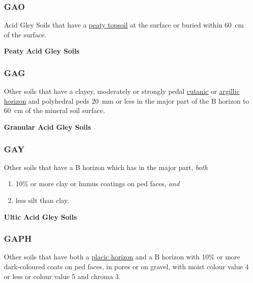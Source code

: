 \documentclass[
  letterpaper,
  DIV=11,
  numbers=noendperiod]{scrreprt}
\providecommand{\tightlist}{%
  \setlength{\itemsep}{0pt}\setlength{\parskip}{0pt}}\usepackage{longtable,booktabs,array}
\begin{document}
\hypertarget{sec-key-GAO}{%
\subsubsection{\texorpdfstring{\textbf{GAO}}{GAO}}\label{sec-key-GAO}}

Acid Gley Soils that have a \protect\hyperlink{sec-diag-pts}{peaty
topsoil} at the surface or buried within 60~cm of the surface.

\textbf{Peaty Acid Gley Soils}

\hypertarget{sec-key-GAG}{%
\subsubsection{\texorpdfstring{\textbf{GAG}}{GAG}}\label{sec-key-GAG}}

Other soils that have a clayey, moderately or strongly pedal
\protect\hyperlink{sec-diag-cuth}{cutanic} or
\protect\hyperlink{sec-diag-argh}{argillic horizon} and polyhedral peds
20~mm or less in the major part of the B horizon to 60~cm of the mineral
soil surface.

\textbf{Granular Acid Gley Soils}

\hypertarget{sec-key-GAY}{%
\subsubsection{\texorpdfstring{\textbf{GAY}}{GAY}}\label{sec-key-GAY}}

Other soils that have a B horizon which has in the major part,
\emph{both}

\begin{enumerate}
\def\labelenumi{\arabic{enumi}.}
\tightlist
\item
  10\% or more clay or humus coatings on ped faces, \emph{and}
\item
  less silt than clay.
\end{enumerate}

\textbf{Ultic Acid Gley Soils}

\hypertarget{sec-key-GAPH}{%
\subsubsection{\texorpdfstring{\textbf{GAPH}}{GAPH}}\label{sec-key-GAPH}}

Other soils that have both a \protect\hyperlink{sec-diag-plac}{placic
horizon} and a B horizon with 10\% or more dark-coloured coats on ped
faces, in pores or on gravel, with moist colour value 4 or less or
colour value 5 and chroma 3.
\end{document}
